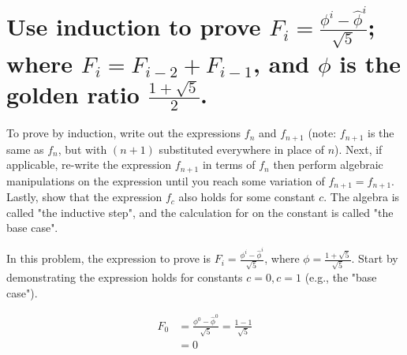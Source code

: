\section[Problem 2]{Use induction to prove $F_i = \frac{\phi^i - \hat{\phi}^i}{\sqrt{5}}$; where $F_i = F_{i-2} + F_{i-1}$, and $\phi$ is the golden ratio $\frac{1 + \sqrt{5}}{2}$.}

To prove by induction, write out the expressions $f_n$ and $f_{n + 1}$ (note: $f_{n + 1}$ is the same as $f_n$, but with $(n + 1)$ substituted everywhere in place of $n$). Next, if applicable, re-write the expression $f_{n + 1}$ in terms of $f_n$ then perform algebraic manipulations on the expression until you reach some variation of $f_{n + 1} = f_{n + 1}$.  Lastly, show that the expression $f_c$ also holds for some constant $c$. The algebra is called "the inductive step", and the calculation for on the constant is called "the base case".

In this problem, the expression to prove is $F_i = \frac{\phi^i - \hat{\phi}^i}{\sqrt{5}}$, where $\phi = \frac{1 + \sqrt{5}}{\sqrt{5}}$. Start by demonstrating the expression holds for constants $c = 0, c = 1$ (e.g., the "base case").

\begin{align}
	F_0 &= \frac{\phi^0 - \hat{\phi}^0}{\sqrt{5}} = \frac{1 - 1}{\sqrt{5}} \\[16pt]
		&= 0
\end{align}
